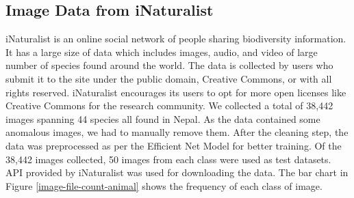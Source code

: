 \documentclass[fleqn, 10pt, twoside]{IOEGC}
\begin{document}
\subsection{Image Data from iNaturalist}
iNaturalist is an online social network of people sharing biodiversity information. It has a large size of data which includes images, audio, and video of large number of species found around the world. The data is collected by users who submit it to the site under the public domain, Creative Commons, or with all rights reserved. iNaturalist encourages its users to opt for more open licenses like Creative Commons for the research community. We collected a total of 38,442 images spanning 44 species all found in Nepal. As the data contained some anomalous images, we had to manually remove them. After the cleaning step, the data was preprocessed as per the Efficient Net Model for better training. Of the 38,442 images collected, 50 images from each class were used as test datasets.
API provided by iNaturalist was used for downloading the data. The bar chart in Figure \ref{image-file-count-animal} shows the frequency of each class of image.
\end{document}
